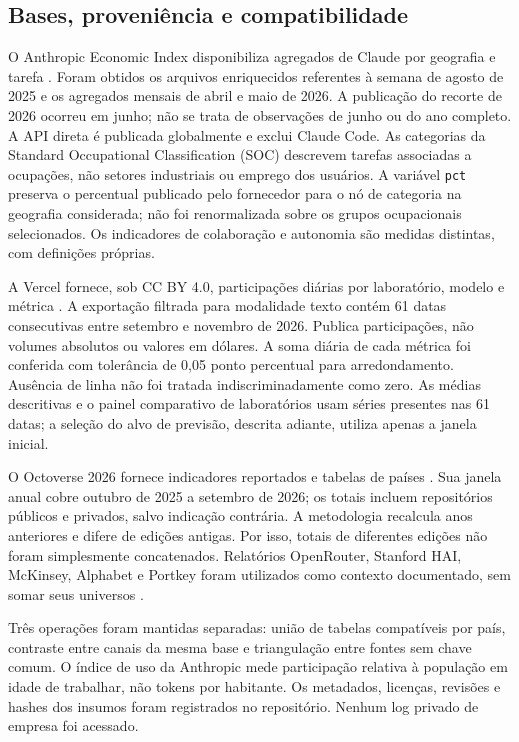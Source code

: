 \documentclass[11pt,a4paper]{article}
\begin{document}
\subsection{Bases, proveniência e compatibilidade}
O Anthropic Economic Index disponibiliza agregados de Claude por geografia e tarefa \cite{aei2025,aei2026}. Foram obtidos os arquivos enriquecidos referentes à semana de agosto de 2025 e os agregados mensais de abril e maio de 2026. A publicação do recorte de 2026 ocorreu em junho; não se trata de observações de junho ou do ano completo. A API direta é publicada globalmente e exclui Claude Code. As categorias da Standard Occupational Classification (SOC) descrevem tarefas associadas a ocupações, não setores industriais ou emprego dos usuários. A variável \texttt{pct} preserva o percentual publicado pelo fornecedor para o nó de categoria na geografia considerada; não foi renormalizada sobre os grupos ocupacionais selecionados. Os indicadores de colaboração e autonomia são medidas distintas, com definições próprias.

A Vercel fornece, sob CC BY 4.0, participações diárias por laboratório, modelo e métrica \cite{vercelexport}. A exportação filtrada para modalidade texto contém 61 datas consecutivas entre setembro e novembro de 2026. Publica participações, não volumes absolutos ou valores em dólares. A soma diária de cada métrica foi conferida com tolerância de 0,05 ponto percentual para arredondamento. Ausência de linha não foi tratada indiscriminadamente como zero. As médias descritivas e o painel comparativo de laboratórios usam séries presentes nas 61 datas; a seleção do alvo de previsão, descrita adiante, utiliza apenas a janela inicial.

O Octoverse 2026 fornece indicadores reportados e tabelas de países \cite{github2026}. Sua janela anual cobre outubro de 2025 a setembro de 2026; os totais incluem repositórios públicos e privados, salvo indicação contrária. A metodologia recalcula anos anteriores e difere de edições antigas. Por isso, totais de diferentes edições não foram simplesmente concatenados. Relatórios OpenRouter, Stanford HAI, McKinsey, Alphabet e Portkey foram utilizados como contexto documentado, sem somar seus universos \cite{openrouter2026,stanford2025,stanford2026,mckinsey2026,google2025,google2026,portkey2026}.

Três operações foram mantidas separadas: união de tabelas compatíveis por país, contraste entre canais da mesma base e triangulação entre fontes sem chave comum. O índice de uso da Anthropic mede participação relativa à população em idade de trabalhar, não tokens por habitante. Os metadados, licenças, revisões e hashes dos insumos foram registrados no repositório. Nenhum log privado de empresa foi acessado.
\end{document}
